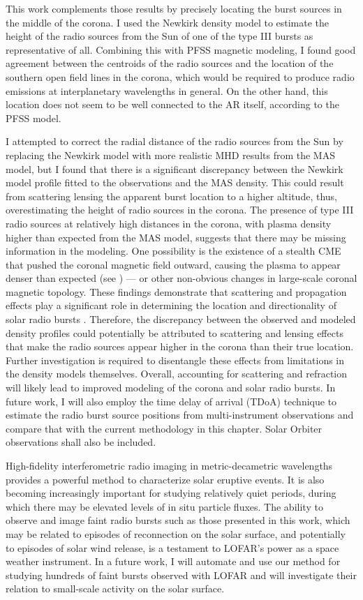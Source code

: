 This work complements those results by precisely locating  the burst sources in the middle of the corona. I used the Newkirk density model to estimate the height of the radio sources from the Sun of one of the type III bursts as representative of all. Combining this with PFSS magnetic modeling, I found good agreement between the centroids of the radio sources and the location of the southern open field lines in the corona, which would be required to produce radio emissions at interplanetary wavelengths in general. On the other hand, this location does not seem to be well connected to the AR itself, according to the PFSS model.

I attempted to correct the radial distance of the radio sources from the Sun by replacing the Newkirk model with more realistic MHD results from the MAS model, but I found that there is a significant discrepancy between the Newkirk model profile fitted to the observations and the MAS density.
This could result from scattering lensing the apparent burst location to a higher altitude, thus, overestimating the height of radio sources in the corona.
The presence of type III radio sources at relatively high distances in the corona, with plasma density higher than expected from the MAS model, suggests that there may be missing information in the modeling. One possibility is the existence of a stealth CME that pushed the coronal magnetic field outward, causing the plasma to appear denser than expected (see \citet{dumbovic_2021}) — or other non-obvious changes in large-scale coronal magnetic topology.
These findings demonstrate that scattering and propagation effects play a significant role in determining the location and directionality of solar radio bursts \citep{kontar_2019, kontar_2023, chen_2023}. Therefore, the discrepancy between the observed and modeled density profiles could potentially be attributed to scattering and lensing effects that make the radio sources appear higher in the corona than their true location. Further investigation is required to disentangle these effects from limitations in the density models themselves. Overall, accounting for scattering and refraction will likely lead to improved modeling of the corona and solar radio bursts.
In future work, I will also employ the time delay of arrival (TDoA) technique \citep{zhang_2019} to estimate the radio burst source positions from multi-instrument observations and compare that with the current methodology in this chapter. Solar Orbiter observations shall also be included.

High-fidelity interferometric radio imaging in metric-decametric wavelengths provides a powerful method to characterize solar eruptive events. It is also becoming increasingly important for studying relatively quiet periods, during which there may be elevated levels of in situ particle fluxes. The ability to observe and image faint radio bursts such as those presented in this work, which may be related to episodes of reconnection on the solar surface, and potentially to episodes of solar wind release, is a testament to LOFAR’s power as a space weather instrument. In a future work, I will automate and use our method for studying hundreds of faint bursts observed with LOFAR and will investigate their relation to small-scale activity on the solar surface.

